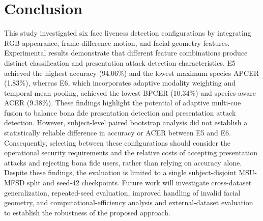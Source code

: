 \documentclass[a4paper,conference]{IEEEtran}
\begin{document}
\section{Conclusion}
This study investigated six face liveness detection configurations by integrating RGB appearance, frame-difference motion, and facial geometry features. Experimental results demonstrate that different feature combinations produce distinct classification and presentation attack detection characteristics. E5 achieved the highest accuracy (94.06\%) and the lowest maximum species APCER (1.83\%), whereas E6, which incorporates adaptive modality weighting and temporal mean pooling, achieved the lowest BPCER (10.34\%) and species-aware ACER (9.38\%). These findings highlight the potential of adaptive multi-cue fusion to balance bona fide presentation detection and presentation attack detection. However, subject-level paired bootstrap analysis did not establish a statistically reliable difference in accuracy or ACER between E5 and E6. Consequently, selecting between these configurations should consider the operational security requirements and the relative costs of accepting presentation attacks and rejecting bona fide users, rather than relying on accuracy alone. Despite these findings, the evaluation is limited to a single subject-disjoint MSU-MFSD split and seed-42 checkpoints. Future work will investigate cross-dataset generalization, repeated-seed evaluation, improved handling of invalid facial geometry, and computational-efficiency analysis and external-dataset evaluation to establish the robustness of the proposed approach.
\end{document}
